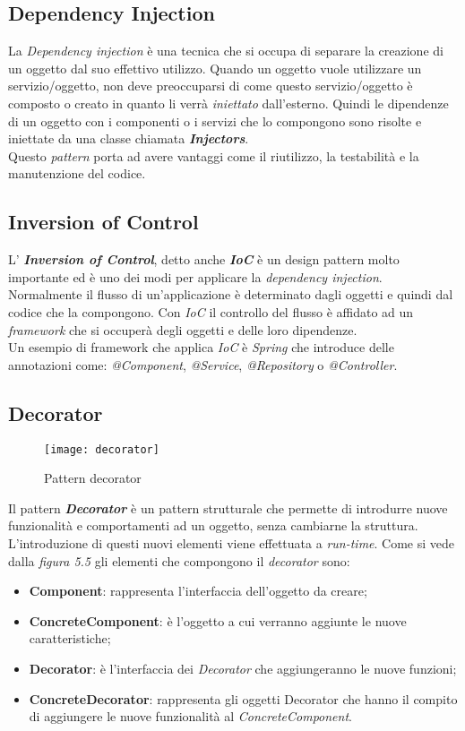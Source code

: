 \subsection*{Dependency Injection}
La \textit{Dependency injection} è una tecnica che si occupa di separare la creazione di un oggetto dal suo effettivo utilizzo. Quando un oggetto vuole utilizzare un servizio/oggetto, non deve preoccuparsi di come questo servizio/oggetto è composto o creato in quanto li verrà \textit{iniettato} dall'esterno. Quindi le dipendenze di un oggetto con i componenti o i servizi che lo compongono sono risolte e iniettate da una classe chiamata \textbf{\textit{Injectors}}.\\
Questo \textit{pattern} porta ad avere vantaggi come il riutilizzo, la testabilità e la manutenzione del codice. 
\newpage
\subsection*{Inversion of Control}  
L' \textbf{\textit{Inversion of Control}}, detto anche \textbf{\textit{IoC}} è un design pattern molto importante ed è uno dei modi per applicare la \textit{dependency injection}.\\
Normalmente il flusso di un'applicazione è determinato dagli oggetti e quindi dal codice che la compongono. Con \textit{IoC} il controllo del flusso è affidato ad un \textit{framework} che si occuperà degli oggetti e delle loro dipendenze.\\
Un esempio di framework che applica \textit{IoC} è \textit{Spring} che introduce delle annotazioni come: \textit{@Component}, \textit{@Service}, \textit{@Repository} o \textit{@Controller}.

\subsection*{Decorator}
 \begin{figure}[H]
    \centering 
    \texttt{[image: decorator]} 
    \bigskip
    \caption{Pattern decorator}
\end{figure}

Il pattern \textit{\textbf{Decorator}} è un pattern strutturale che permette di introdurre nuove funzionalità e comportamenti ad un oggetto, senza cambiarne la struttura. L'introduzione di questi nuovi elementi viene effettuata a \textit{run-time}.
Come si vede dalla \textit{figura 5.5} gli elementi che compongono il \textit{decorator} sono:
\begin{itemize}
\item \textbf{Component}: rappresenta l'interfaccia dell'oggetto da creare;
\item \textbf{ConcreteComponent}: è l'oggetto a cui verranno aggiunte le nuove caratteristiche;
\item \textbf{Decorator}: è l'interfaccia dei \textit{Decorator} che aggiungeranno le nuove funzioni;			 
\item \textbf{ConcreteDecorator}: rappresenta gli oggetti Decorator che hanno il compito di aggiungere le nuove funzionalità al \textit{ConcreteComponent}. 
\end{itemize}
